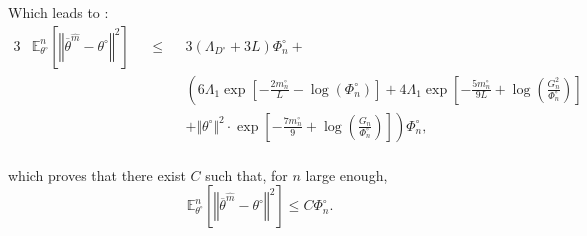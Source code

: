 \bigskip

Which leads to :
\begin{alignat*}{3}
&\mathds{E}_{\theta^{\circ}}^{n}\left[\left\Vert \overline{\theta}^{\widehat{m}} - \theta^{\circ} \right\Vert^{2}\right] &&\leq&& 3 \left( \Lambda_{D^{\circ}} + 3 L \right) \Phi_{n}^{\circ} +\\
& && &&\left(6 \Lambda_{1} \exp\left[- \frac{2 m_{n}^{\circ}}{L} - \log\left(\Phi_{n}^{\circ}\right)\right] + 4 \Lambda_{1} \exp\left[-\frac{5 m_{n}^{\circ}}{9 L} + \log \left(\frac{G_{n}^{2}}{\Phi_{n}^{\circ}}\right)\right] \right.\\
& && && \left. + \Vert \theta^{\circ} \Vert^{2} \cdot \exp\left[-\frac{7 m_{n}^{\circ}}{9} + \log\left(\frac{G_{n}}{\Phi_{n}^{\circ}}\right)\right]\right) \Phi_{n}^{\circ},\\
\end{alignat*}

which proves that there exist $C$ such that, for $n$ large enough,
\[\mathds{E}_{\theta^{\circ}}^{n}\left[\left\Vert \overline{\theta}^{\widehat{m}} - \theta^{\circ} \right\Vert^{2}\right] \leq C \Phi_{n}^{\circ}.\]

